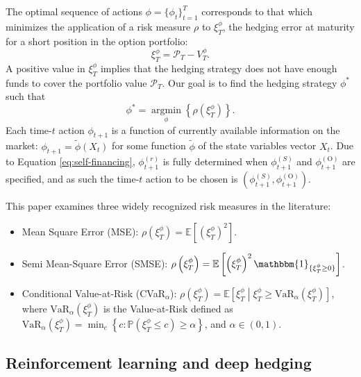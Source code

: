 \documentclass[12pt]{article}
\begin{document}
The optimal sequence of actions $\phi= \{ \phi_t\}^T_{t=1}$ corresponds to that which minimizes the application of a risk measure $\rho$ to $\xi_{T}^{\phi}$, the hedging error at maturity for a short position in the option portfolio:
\begin{equation*}
    \xi_{T}^{\phi} = \mathcal{P}_{T} - V_{T}^{\phi}.
\end{equation*}
A positive value in $\xi_{T}^{\phi}$ implies that the hedging strategy does not have enough funds to cover the portfolio value $\mathcal{P}_{T}$. Our goal is to find the hedging strategy $\phi^*$ such that
\begin{equation}\label{Hedging_problem}
\phi^{*}=\mathop{\arg \min}\limits_{\phi} \left\{ \rho  \left( \xi_{T}^{\phi} \right) \right\}.
\end{equation}
Each time-$t$ action $\phi_{t+1}$ is a function of currently available information on the market: $\phi_{t+1}= \tilde{\phi}(X_t)$ for some function $\tilde{\phi}$ of the state variables vector $X_t$. 
Due to Equation \eqref{eq:self-financing}, $\phi_{t+1}^{(r)}$ is fully determined when $\phi_{t+1}^{(S)}$ and $\phi^{(\text{O})}_{t+1}$ are specified, and as such the time-$t$ action to be chosen is $(\phi_{t+1}^{(S)},\phi^{(\text{O})}_{t+1})$.

This paper examines three widely recognized risk measures in the literature:
\begin{itemize}
    \item Mean Square Error (MSE): $\rho\left(\xi_{T}^{\phi}\right)= \mathbb{E}\left[\left(\xi_{T}^{\phi}\right)^{2}\right]$.
    \item Semi Mean-Square Error (SMSE): $\rho\left(\xi_{T}^{\phi}\right)= \mathbb{E}\left[\left(\xi_{T}^{\phi}\right)^{2}\mathbbm{1}_{\{\xi_{T}^{\phi}\geq 0\}}\right]$.
    \item Conditional Value-at-Risk (CVaR$_\alpha$): $\rho\left(\xi_{T}^{\phi}\right)=\mathbb{E}\left[\xi_{T}^{\phi}\middle| \xi_{T}^{\phi}\geq \mbox{VaR}_{\alpha}\left(\xi_{T}^{\phi}\right)\right]$, where $\mbox{VaR}_{\alpha}\left(\xi_{T}^{\phi}\right)$ is the Value-at-Risk defined as $\mbox{VaR}_{\alpha}\left(\xi_{T}^{\phi}\right) = \min_{c}\left\{ c:\mathbb{P}\left(\xi_{T}^{\phi}\leq c\right)\geq \alpha \right\}$, and $\alpha \in (0,1)$.
\end{itemize}

\subsection{Reinforcement learning and deep hedging}\label{subsec:rl_framework}
\end{document}
